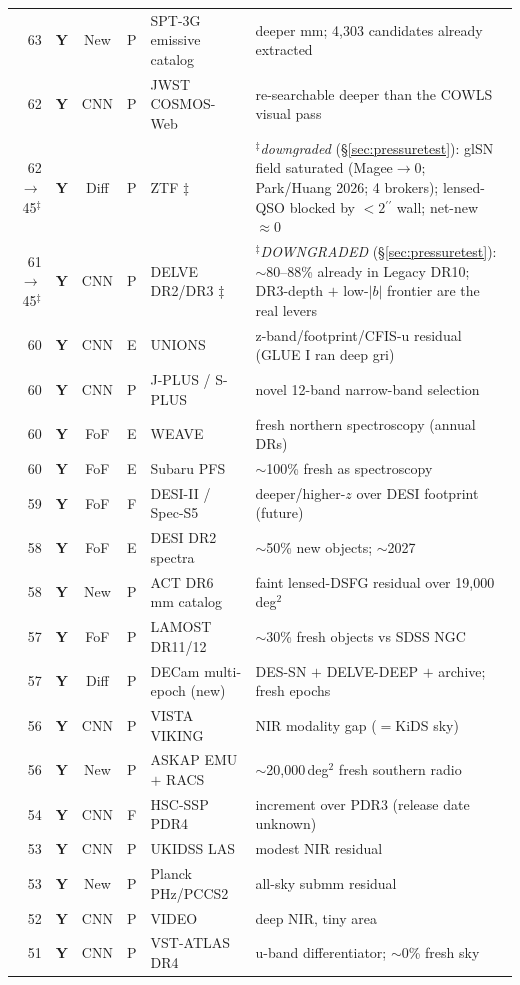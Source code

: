 \documentclass[11pt,letterpaper]{article}
\providecommand{\arcsec}{\ensuremath{^{\prime\prime}}}
\newcommand{\rgY}{\textcolor{orange!85!black}{\textbf{Y}}}
\begin{document}
{\begin{longtable}{@{}r c c c >{\raggedright\arraybackslash}p{3.3cm} >{\raggedright\arraybackslash}p{6.2cm}@{}}
63 & \rgY & New & P & SPT-3G emissive catalog & deeper mm; 4{,}303 candidates already extracted \\
62 & \rgY & CNN & P & JWST COSMOS-Web & re-searchable deeper than the COWLS visual pass \\
62$\to$45$^\ddagger$ & \rgY & Diff & P & ZTF $\ddagger$ & $^\ddagger$\emph{downgraded} (\S\ref{sec:pressuretest}): glSN field saturated (Magee$\to$0; Park/Huang 2026; 4 brokers); lensed-QSO blocked by $<2\arcsec$ wall; net-new $\approx0$ \\
61$\to$45$^\ddagger$ & \rgY & CNN & P & DELVE DR2/DR3 $\ddagger$ & $^\ddagger$\emph{DOWNGRADED} (\S\ref{sec:pressuretest}): $\sim$80--88\% already in Legacy DR10; DR3-depth $+$ low-$|b|$ frontier are the real levers \\
60 & \rgY & CNN & E & UNIONS & z-band/footprint/CFIS-u residual (GLUE I ran deep gri) \\
60 & \rgY & CNN & P & J-PLUS / S-PLUS & novel 12-band narrow-band selection \\
60 & \rgY & FoF & E & WEAVE & fresh northern spectroscopy (annual DRs) \\
60 & \rgY & FoF & E & Subaru PFS & $\sim$100\% fresh as spectroscopy \\
59 & \rgY & FoF & F & DESI-II / Spec-S5 & deeper/higher-$z$ over DESI footprint (future) \\
58 & \rgY & FoF & E & DESI DR2 spectra & $\sim$50\% new objects; $\sim$2027 \\
58 & \rgY & New & P & ACT DR6 mm catalog & faint lensed-DSFG residual over 19{,}000\,deg$^2$ \\
57 & \rgY & FoF & P & LAMOST DR11/12 & $\sim$30\% fresh objects vs SDSS NGC \\
57 & \rgY & Diff & P & DECam multi-epoch (new) & DES-SN $+$ DELVE-DEEP $+$ archive; fresh epochs \\
56 & \rgY & CNN & P & VISTA VIKING & NIR modality gap ($=$KiDS sky) \\
56 & \rgY & New & P & ASKAP EMU $+$ RACS & $\sim$20{,}000\,deg$^2$ fresh southern radio \\
54 & \rgY & CNN & F & HSC-SSP PDR4 & increment over PDR3 (release date unknown) \\
53 & \rgY & CNN & P & UKIDSS LAS & modest NIR residual \\
53 & \rgY & New & P & Planck PHz/PCCS2 & all-sky submm residual \\
52 & \rgY & CNN & P & VIDEO & deep NIR, tiny area \\
51 & \rgY & CNN & P & VST-ATLAS DR4 & u-band differentiator; $\sim$0\% fresh sky \\

\end{longtable}}
\end{document}
